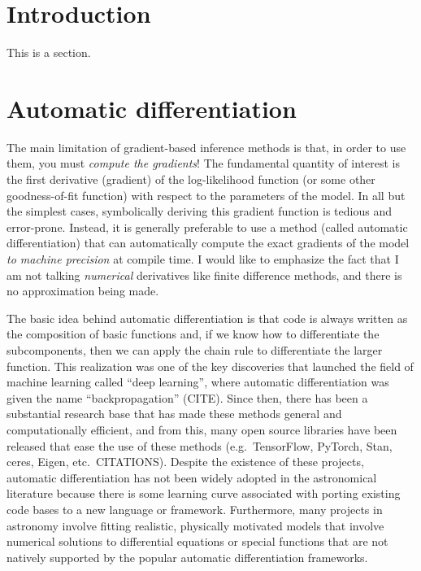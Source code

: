 \documentclass[modern]{aastex62}
\begin{document}
\section{Introduction}

This is a section.

\section{Automatic differentiation}

The main limitation of gradient-based inference methods is that, in order to
use them, you must \emph{compute the gradients}!
The fundamental quantity of interest is the first derivative (gradient) of the
log-likelihood function (or some other goodness-of-fit function) with respect
to the parameters of the model.
In all but the simplest cases, symbolically deriving this gradient function is
tedious and error-prone.
Instead, it is generally preferable to use a method (called automatic
differentiation) that can automatically compute the exact gradients of the
model \emph{to machine precision} at compile time.
I would like to emphasize the fact that I am not talking \emph{numerical}
derivatives like finite difference methods, and there is no approximation
being made.

The basic idea behind automatic differentiation is that code is always written
as the composition of basic functions and, if we know how to differentiate the
subcomponents, then we can apply the chain rule to differentiate the larger
function.
This realization was one of the key discoveries that launched the field of
machine learning called ``deep learning'', where automatic differentiation was
given the name ``backpropagation'' (CITE).
Since then, there has been a substantial research base that has made these
methods general and computationally efficient, and from this, many open source
libraries have been released that ease the use of these methods (e.g.\
TensorFlow, PyTorch, Stan, ceres, Eigen, etc.\ CITATIONS).
Despite the existence of these projects, automatic differentiation has not
been widely adopted in the astronomical literature because there is some
learning curve associated with porting existing code bases to a new language
or framework.
Furthermore, many projects in astronomy involve fitting realistic, physically
motivated models that involve numerical solutions to differential equations
or special functions that are not natively supported by the popular automatic
differentiation frameworks.
\end{document}
